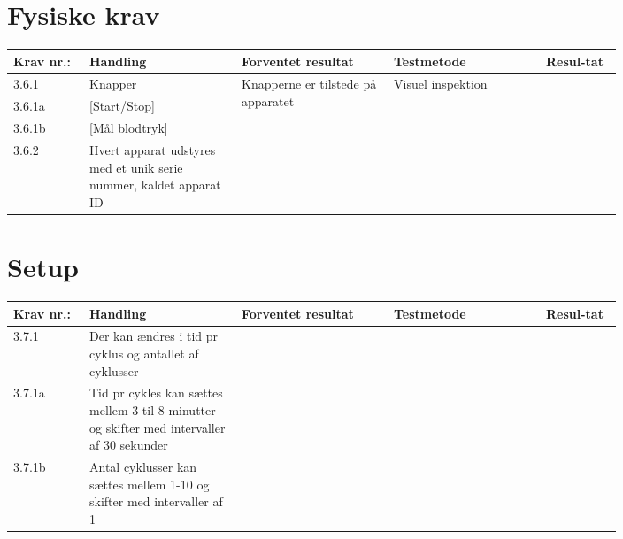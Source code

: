 			\section{Fysiske krav}
				\begin{longtable}{|p{0.1\linewidth}|p{0.2\linewidth}|p{0.2\linewidth}|p{0.2\linewidth}|p{0.1\linewidth}|}
					\hline
					\rowcolor{usDef}
					Krav nr.: & Handling & Forventet resultat & Testmetode & Resul-tat  \\\hline
					3.6.1& Knapper & \multirow{4}{\linewidth}{Knapperne er tilstede på apparatet}  & \multirow{4}{\linewidth}{Visuel inspektion}  & \multirow{4}{\linewidth}{}  \\ \cline{1-2}
					3.6.1a& [Start/Stop] & &  & \\ \cline{1-2}
					3.6.1b& [Mål blodtryk] & &  & \\ \cline{1-2}
					3.6.2& Hvert apparat udstyres med et unik serie nummer, kaldet apparat ID & &  & \\ \hline
				\end{longtable}
				
				\pagebreak
				\section{Setup}
				\begin{longtable}{|p{0.1\linewidth}|p{0.2\linewidth}|p{0.2\linewidth}|p{0.2\linewidth}|p{0.1\linewidth}|}
					\hline
					\rowcolor{usDef}
					Krav nr.: & Handling & Forventet resultat & Testmetode & Resul-tat  \\\hline
					3.7.1& Der kan ændres i tid pr cyklus og antallet af cyklusser & \multirow{3}{\linewidth}{\fxnote{Tilføj test}}  & \multirow{3}{\linewidth}{}  & \multirow{3}{\linewidth}{}  \\ \cline{1-2}
					3.7.1a& Tid pr cykles kan sættes mellem 3 til 8 minutter og skifter med intervaller af 30 sekunder & &  & \\ \cline{1-2}
					3.7.1b& Antal cyklusser kan sættes mellem 1-10 og skifter med intervaller af 1& &  & \\ \hline
				\end{longtable}